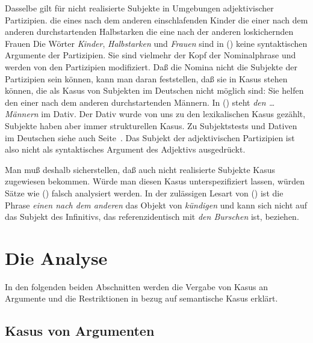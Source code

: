 Dasselbe gilt für nicht realisierte Subjekte in Umgebungen adjektivischer Partizipien.
\eal
\label{bsp-nominativ-adj}
\ex die eines nach dem anderen einschlafenden Kinder
\ex die einer nach dem anderen durchstartenden Halbstarken
\ex die eine nach der anderen loskichernden Frauen
\zl
Die Wörter \emph{Kinder}, \emph{Halbstarken} und \emph{Frauen} sind in () keine syntaktischen
Argumente der Partizipien. Sie sind vielmehr der Kopf der Nominalphrase und werden von den Partizipien
modifiziert. Daß die Nomina nicht die Subjekte der Partizipien sein können, kann man daran
feststellen, daß sie in Kasus stehen können, die als Kasus von Subjekten im Deutschen nicht möglich sind:
\ea
Sie helfen den einer nach dem anderen durchstartenden Männern.
\z
In () steht \emph{den \ldots{} Männern} im Dativ. Der Dativ wurde von uns zu den lexikalischen
Kasus gezählt, Subjekte haben aber immer strukturellen Kasus. Zu Subjektstests und Dativen im Deutschen
siehe auch Seite~\pageref{page-dativsubjekte}.
Das Subjekt der adjektivischen Partizipien ist also nicht als syntaktisches Argument des
Adjektivs ausgedrückt.

Man muß deshalb sicherstellen, daß auch nicht realisierte Subjekte Kasus zugewiesen bekommen.
Würde man diesen Kasus unterspezifiziert lassen, würden Sätze wie () falsch analysiert werden.
\z
In der zulässigen Lesart von () ist die Phrase 
\emph{einen nach dem anderen} das Objekt von \emph{kündigen} und kann
sich nicht auf das Subjekt des Infinitivs, das referenzidentisch
mit \emph{den Burschen} ist, beziehen.



\section{Die Analyse}

In den folgenden beiden Abschnitten werden die Vergabe von Kasus an Argumente und 
die Restriktionen in bezug auf semantische Kasus erklärt. 


\subsection{Kasus von Argumenten}

